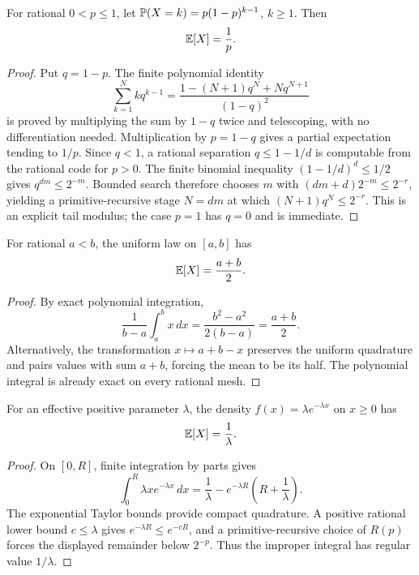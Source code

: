 \begin{proposition}[Geometric]\label{prop:geometric}
For rational \(0<p\le1\), let
\(\mathbb P(X=k)=p(1-p)^{k-1}\), \(k\ge1\).  Then
\[
 \mathbb E[X]=\frac1p.
\]
\end{proposition}

\begin{proof}
Put \(q=1-p\).  The finite polynomial identity
\[
 \sum_{k=1}^{N}kq^{k-1}
 =\frac{1-(N+1)q^N+Nq^{N+1}}{(1-q)^2}
\]
is proved by multiplying the sum by \(1-q\) twice and telescoping, with no
differentiation needed.  Multiplication by \(p=1-q\) gives a partial
expectation tending to \(1/p\).  Since \(q<1\), a rational separation
\(q\le1-1/d\) is computable from the rational code for \(p>0\).  The
finite binomial inequality \((1-1/d)^d\le1/2\) gives
\(q^{dm}\le2^{-m}\).  Bounded search therefore chooses \(m\) with
\((dm+d)2^{-m}\le2^{-r}\), yielding a primitive-recursive stage
\(N=dm\) at which \((N+1)q^N\le2^{-r}\).  This is an explicit tail
modulus; the case \(p=1\) has \(q=0\) and is immediate.
\end{proof}

\begin{proposition}[Uniform]\label{prop:uniform}
For rational \(a<b\), the uniform law on \([a,b]\) has
\[
 \mathbb E[X]=\frac{a+b}{2}.
\]
\end{proposition}

\begin{proof}
By exact polynomial integration,
\[
 \frac1{b-a}\int_a^b x\,dx
 =\frac{b^2-a^2}{2(b-a)}=\frac{a+b}{2}.
\]
Alternatively, the transformation \(x\mapsto a+b-x\) preserves the uniform
quadrature and pairs values with sum \(a+b\), forcing the mean to be its half.
The polynomial integral is already exact on every rational mesh.
\end{proof}

\begin{proposition}[Exponential]\label{prop:exponential}
For an effective positive parameter \(\lambda\), the density
\(f(x)=\lambda e^{-\lambda x}\) on \(x\ge0\) has
\[
 \mathbb E[X]=\frac1\lambda.
\]
\end{proposition}

\begin{proof}
On \([0,R]\), finite integration by parts gives
\[
 \int_0^R\lambda xe^{-\lambda x}\,dx
 =\frac1\lambda-e^{-\lambda R}\left(R+\frac1\lambda\right).
\]
The exponential Taylor bounds provide compact quadrature.  A positive rational
lower bound \(c\le\lambda\) gives
\(e^{-\lambda R}\le e^{-cR}\), and a primitive-recursive choice of \(R(p)\)
forces the displayed remainder below \(2^{-p}\).  Thus the improper integral
has regular value \(1/\lambda\).
\end{proof}

